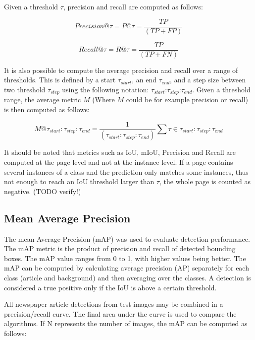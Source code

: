 \documentclass[english, bibtex]{kththesis}
\begin{document}
Given a threshold $\tau$, precision and recall are computed as follows:

\begin{equation}
	Precision @ \tau = P@\tau = \frac{TP}{(TP + FP)}
  	\label{eqn:precision}
\end{equation}

\begin{equation}
	Recall @ \tau = R@\tau = \frac{TP}{(TP + FN)}
  	\label{eqn:recall}
\end{equation}

It is also possible to compute the average precision and recall over a range of thresholds. This is defined by a start $\tau_{start}$, an end $\tau_{end}$, and a step size between two threshold $\tau_{step}$ using the following notation: $\tau_{start}$:$\tau_{step}$:$\tau_{end}$. Given a threshold range, the average metric $M$ (Where $M$ could be for example precision or recall) is then computed as follows:

\begin{equation}
M@\tau_{start}:\tau_{step}:\tau_{end} = \frac{1}{(\tau_{start}:\tau_{step}:\tau_{end})} \sum{} \tau \in \tau_{start}:\tau_{step}:\tau_{end}
    \label{eqn:rangem}
\end{equation}

It should be noted that metrics such as IoU, mIoU, Precision and Recall are computed at the page level and not at the instance level. If a page contains several instances of a class and the prediction only matches some instances, thus not enough to reach an IoU threshold larger than $\tau$, the whole page is counted as negative. (TODO verify!)


\subsection{Mean Average Precision}

The mean Average Precision (mAP) was used to evaluate detection performance. The mAP metric is the product of precision and recall of detected bounding boxes. The mAP value ranges from 0 to 1, with higher values being better. The mAP can be computed by calculating average precision (AP) separately for each class (article and background) and then averaging over the classes. A detection is considered a true positive only if the IoU is above a certain threshold. 

All newspaper article detections from test images may be combined in a precision/recall curve. The final area under the curve is used to compare the algorithms. If N represents the number of images, the mAP can be computed as follows:
\end{document}
